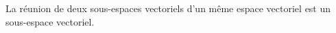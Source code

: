 La réunion de deux sous-espaces vectoriels d'un même espace vectoriel est un sous-espace vectoriel.

\begin{reponses}
\end{reponses}

